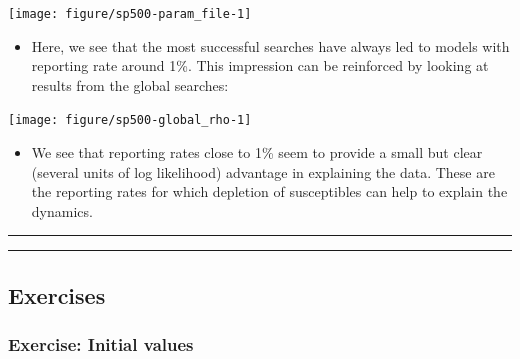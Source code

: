 \documentclass[]{article}
\newenvironment{Shaded}{\begin{snugshade}}{\end{snugshade}}
\newcommand{\KeywordTok}[1]{\textcolor[rgb]{0.13,0.29,0.53}{\textbf{#1}}}
\newcommand{\DataTypeTok}[1]{\textcolor[rgb]{0.13,0.29,0.53}{#1}}
\newcommand{\DecValTok}[1]{\textcolor[rgb]{0.00,0.00,0.81}{#1}}
\newcommand{\StringTok}[1]{\textcolor[rgb]{0.31,0.60,0.02}{#1}}
\newcommand{\OperatorTok}[1]{\textcolor[rgb]{0.81,0.36,0.00}{\textbf{#1}}}
\newcommand{\NormalTok}[1]{#1}
\providecommand{\tightlist}{%
  \setlength{\itemsep}{0pt}\setlength{\parskip}{0pt}}
\begin{document}
\begin{center}\texttt{[image: figure/sp500-param\_file-1]} \end{center}

\begin{itemize}
\tightlist
\item
  Here, we see that the most successful searches have always led to
  models with reporting rate around 1\%. This impression can be
  reinforced by looking at results from the global searches:
\end{itemize}

\begin{Shaded}
\end{Shaded}

\begin{center}\texttt{[image: figure/sp500-global\_rho-1]} \end{center}

\begin{itemize}
\tightlist
\item
  We see that reporting rates close to 1\% seem to provide a small but
  clear (several units of log likelihood) advantage in explaining the
  data. These are the reporting rates for which depletion of
  susceptibles can help to explain the dynamics.
\end{itemize}

\begin{center}\rule{0.5\linewidth}{\linethickness}\end{center}

\begin{center}\rule{0.5\linewidth}{\linethickness}\end{center}

\subsection{Exercises}\label{exercises}

\subsubsection{Exercise: Initial values}\label{exercise-initial-values}
\end{document}
